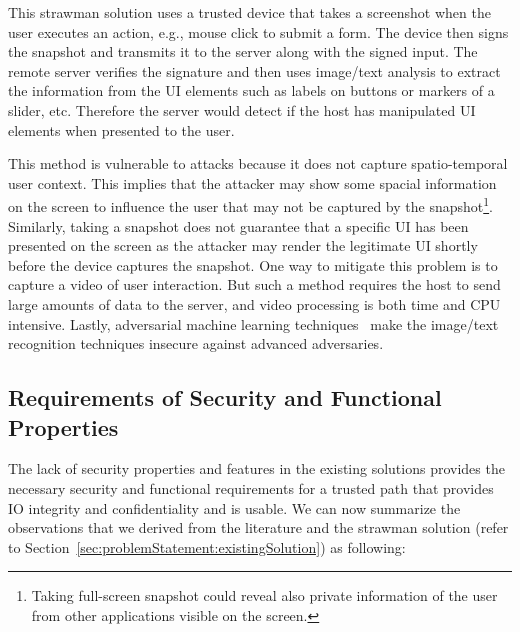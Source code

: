 


 This strawman solution uses a trusted device that takes a screenshot when the user executes an action, e.g., mouse click to submit a form. The device then signs the snapshot and transmits it to the server along with the signed input. The remote server verifies the signature and then uses image/text analysis to extract the information from the UI elements such as labels on buttons or markers of a slider, etc. Therefore the server would detect if the host has manipulated UI elements when presented to the user.

This method is vulnerable to attacks because it does not capture spatio-temporal user context. This implies that the attacker may show some spacial information on the screen to influence the user that may not be captured by the snapshot\footnote{Taking full-screen snapshot could reveal also private information of the user from other applications visible on the screen.}. Similarly, taking a snapshot does not guarantee that a specific UI has been presented on the screen as the attacker may render the legitimate UI shortly before the device captures the snapshot.
One way to mitigate this problem is to capture a video of user interaction. But such a method requires the host to send large amounts of data to the server, and video processing is both time and CPU intensive. 
Lastly, adversarial machine learning techniques~\cite{eykholt2017robust,sitawarin2018rogue} make the image/text recognition techniques insecure against advanced adversaries.


\subsection{Requirements of Security and Functional Properties}
\label{sec:problemStatement:goals}

The lack of security properties and features in the existing solutions provides the necessary security and functional requirements for a trusted path that provides IO integrity and confidentiality and is usable. We can now summarize the observations that we derived from the literature and the strawman solution (refer to Section~\ref{sec:problemStatement:existingSolution}) as following:

